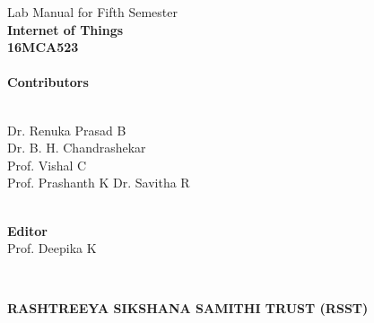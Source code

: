 \documentclass[12pt,a4paper]{article}
\begin{document}
\center %
\begin{center}
   	 
\hspace{8cm}

\Large{Lab Manual for Fifth Semester}\\
\textbf{{\LARGE{Internet of Things  \\16MCA523}}} \\\vspace{-0.3cm}
\vspace{3cm}
\HRule\\[0.4cm]
{\Large \bfseries Contributors}\\[0.4cm] %
\HRule \\[1.5cm]

\begin{minipage}{0.4\textwidth}
\begin{center} \large
Dr. Renuka Prasad B \\ 
Dr. B. H. Chandrashekar \\ 
Prof. Vishal C \\
Prof. Prashanth K 
Dr. Savitha R \\
\vspace{2cm}

\HRule\\[0.4cm]
{\Large \bfseries Editor}\\[0.4cm]
Prof. Deepika K
\HRule \\[1.5cm]
\end{center}
\end{minipage}

~
\\[4cm]
\vfill %
\end{center}


\clearpage
\thispagestyle{plain}
\begin{center}\textbf{RASHTREEYA SIKSHANA SAMITHI TRUST (RSST)}\end{center}
\end{document}
